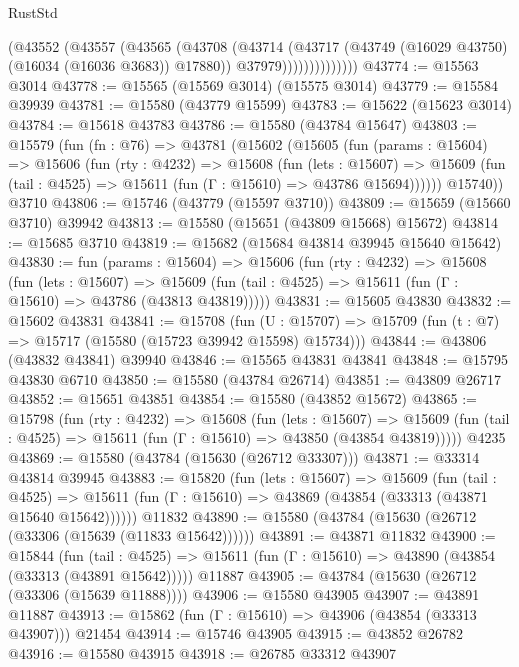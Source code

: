\begin{lexlean}{RustStd}
\begin{coremodule}
                      (@43552
                        (@43557
                          (@43565
                            (@43708
                              (@43714
                                (@43717 (@43749 (@16029 @43750) (@16034 (@16036 @3683)) @17880))
                                @37979))))))))))))))
@43774 := @15563 @3014
@43778 := @15565 (@15569 @3014) (@15575 @3014)
@43779 := @15584 @39939
@43781 := @15580 (@43779 @15599)
@43783 := @15622 (@15623 @3014)
@43784 := @15618 @43783
@43786 := @15580 (@43784 @15647)
@43803 := @15579
    (fun (fn : @76) =>
    @43781
      (@15602
        (@15605
          (fun (params : @15604) =>
          @15606
            (fun (rty : @4232) =>
            @15608
              (fun (lets : @15607) =>
              @15609 (fun (tail : @4525) => @15611 (fun (Γ : @15610) => @43786 @15694))))))
        @15740))
    @3710
@43806 := @15746 (@43779 (@15597 @3710))
@43809 := @15659 (@15660 @3710) @39942
@43813 := @15580 (@15651 (@43809 @15668) @15672)
@43814 := @15685 @3710
@43819 := @15682 (@15684 @43814 @39945 @15640 @15642)
@43830 := fun (params : @15604) =>
  @15606
    (fun (rty : @4232) =>
    @15608
      (fun (lets : @15607) =>
      @15609 (fun (tail : @4525) => @15611 (fun (Γ : @15610) => @43786 (@43813 @43819)))))
@43831 := @15605 @43830
@43832 := @15602 @43831
@43841 := @15708
    (fun (U : @15707) => @15709 (fun (t : @7) => @15717 (@15580 (@15723 @39942 @15598) @15734)))
@43844 := @43806 (@43832 @43841) @39940
@43846 := @15565 @43831 @43841
@43848 := @15795 @43830 @6710
@43850 := @15580 (@43784 @26714)
@43851 := @43809 @26717
@43852 := @15651 @43851
@43854 := @15580 (@43852 @15672)
@43865 := @15798
    (fun (rty : @4232) =>
    @15608
      (fun (lets : @15607) =>
      @15609 (fun (tail : @4525) => @15611 (fun (Γ : @15610) => @43850 (@43854 @43819)))))
    @4235
@43869 := @15580 (@43784 (@15630 (@26712 @33307)))
@43871 := @33314 @43814 @39945
@43883 := @15820
    (fun (lets : @15607) =>
    @15609
      (fun (tail : @4525) =>
      @15611 (fun (Γ : @15610) => @43869 (@43854 (@33313 (@43871 @15640 @15642))))))
    @11832
@43890 := @15580 (@43784 (@15630 (@26712 (@33306 (@15639 (@11833 @15642))))))
@43891 := @43871 @11832
@43900 := @15844
    (fun (tail : @4525) => @15611 (fun (Γ : @15610) => @43890 (@43854 (@33313 (@43891 @15642)))))
    @11887
@43905 := @43784 (@15630 (@26712 (@33306 (@15639 @11888))))
@43906 := @15580 @43905
@43907 := @43891 @11887
@43913 := @15862 (fun (Γ : @15610) => @43906 (@43854 (@33313 @43907))) @21454
@43914 := @15746 @43905
@43915 := @43852 @26782
@43916 := @15580 @43915
@43918 := @26785 @33312 @43907

\end{coremodule}
\end{lexlean}
